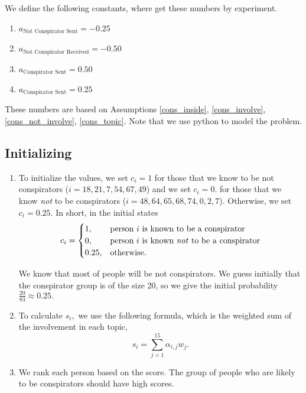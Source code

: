 \documentclass{icmmcm}
\begin{document}
We define the following constants,
where get these numbers by experiment.
\begin{enumerate}
\item $a_{\text{Not Conspirator Sent}} = -0.25$
\item $a_{\text{Not Conspirator Received}} = -0.50$
\item $a_{\text{Conspirator Sent}} = 0.50$
\item $a_{\text{Conspirator Sent}} = 0.25$
\end{enumerate}

These numbers are based on Assumptions \eqref{cons_inside}, \eqref{cons_involve}, \eqref{cons_not_involve}, 
\eqref{cons_topic}.
Note that we use python to model the problem.

\subsection{Initializing}
\begin{enumerate}
\item To initialize the values, we set $c_i = 1$ for those that
we know to be not conspirators ($i=18,21,7,54,67,49$)
and we set $c_i = 0.$ for those that
we know \textit{not} to be conspirators ($i=48,64,65,68,74,0,2,7$).
Otherwise, we set $c_i = 0.25.$ In short, in the initial states
\[c_i=
\begin{cases}
1,	& \text{person $i$ is known to be a conspirator}\\
0,	& \text{person $i$ is known \textit{not} to be a conspirator}\\
0.25,	&\text{otherwise.}
\end{cases}\]

We know that most of people will be not conspirators. 
We guess initially that the conspirator group 
is of the size 20, so we give the initial probability
$\frac{20}{83} \approx 0.25.$

\item To calculate $s_i,$ we use the following formula,
which is the weighted sum of the involvement in each topic,
\[s_i = \sum_{j=1}^{15} \alpha_{i,j} w_j.\]

\item We rank each person based on the score.
The group of people who are likely to be 
conspirators should have high scores.
\end{enumerate}
\end{document}
